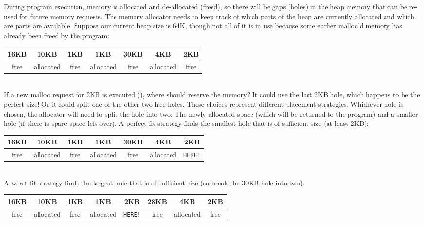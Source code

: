 During program execution, memory is allocated and de-allocated (freed), so there will be gaps (holes) in the heap memory that can be re-used for future memory requests.
The memory allocator needs to keep track of which parts of the heap are currently allocated and which are parts are available.
Suppose our current heap size is 64K, though not all of it is in use because some earlier malloc'd memory has already been freed by the program:
\\
\begin{center}
\begin{tabular}{ | c | c | c | c | c | c | c | }
\hline
16KB & 10KB & 1KB & 1KB & 30KB & 4KB & 2KB \\ \hline
free & allocated & free & allocated & free & allocated & free \\
\hline
\end{tabular}
\end{center}
\\
If a new malloc request for 2KB is executed (), where should  reserve the memory?
It could use the last 2KB hole, which happens to be the perfect size!
Or it could split one of the other two free holes.
These choices represent different placement strategies.
Whichever hole is chosen, the allocator will need to split the hole into two: The newly allocated space (which will be returned to the program) and a smaller hole (if there is spare space left over).
A perfect-fit strategy finds the smallest hole that is of sufficient size (at least 2KB):
\\
\begin{center}
\begin{tabular}{ | c | c | c | c | c | c | c | }
\hline
16KB & 10KB & 1KB & 1KB & 30KB & 4KB & 2KB \\ \hline
free & allocated & free & allocated & free & allocated & \texttt{HERE!} \\
\hline
\end{tabular}
\end{center}
\\
A worst-fit strategy finds the largest hole that is of sufficient size (so break the 30KB hole into two):
\\
\begin{center}
\begin{tabular}{ | c | c | c | c | c | c | c | c | }
\hline
16KB & 10KB & 1KB & 1KB & 2KB & 28KB & 4KB & 2KB \\ \hline
free & allocated & free & allocated & \texttt{HERE!} & free & allocated & free \\
\hline
\end{tabular}
\end{center}
